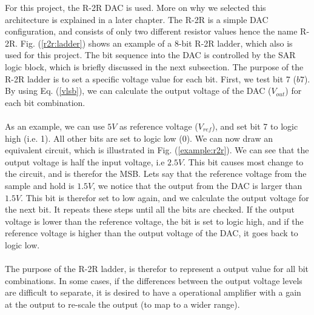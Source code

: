 \documentclass[english, 12pt, a4paper]{ifimaster}
\begin{document}
For this project, the R-2R DAC is used. More on why we selected this architecture is explained in a later chapter. The R-2R is a simple DAC configuration, and consists of only two different 
resistor values hence the name R-2R. Fig. (\ref{r2r:ladder}) shows an example of a 8-bit R-2R ladder, which also is used for this project. The bit sequence into the DAC is controlled by the SAR logic
block, which is briefly discussed in the next subsection. The purpose of the R-2R ladder is to set a specific voltage value for each bit. First, we test bit 7 (\(b7\)). By using Eq. (\ref{vlsb}), we 
can calculate the output voltage of the DAC (\(V_{out}\)) for each bit combination.\\
\\
As an example, we can use \(5 V\) as reference voltage (\(V_{ref}\)), and set bit 7 to logic high (i.e. 1). All other bits are set to logic low (0). We can now draw an equivalent circuit, 
which is illustrated in Fig. (\ref{example:r2r}). We can see that the output voltage is half the input voltage, i.e \(2.5 V\). 
This bit causes most change to the circuit, and is therefor the MSB. Lets say that the reference voltage from the sample and hold is \(1.5 V\), we notice that the output from the DAC is larger than \(1.5 V\).
This bit is therefor set to low again, and we calculate the output voltage for the next bit. It repeats these steps until all the bits are checked. If the output voltage is lower than the reference 
voltage, the bit is set to logic high, and if the reference voltage is higher than the output voltage of the DAC, it goes back to logic low.\\
\\
The purpose of the R-2R ladder, is therefor to represent a output value for all bit combinations. In some cases, if the differences between the output voltage levels are difficult to separate, 
it is desired to have a operational amplifier with a gain at the output to re-scale the output (to map to a wider range). 
\end{document}
